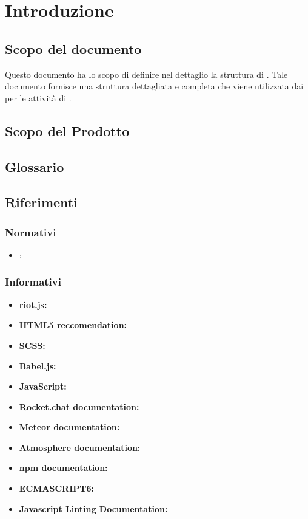 \section{Introduzione}
\subsection{Scopo del documento}
Questo documento ha lo scopo di definire nel dettaglio la struttura di \capitolato. Tale documento fornisce una struttura dettagliata e completa che viene utilizzata dai \ProgrP per le attività di .
\subsection{Scopo del Prodotto}
\scopoProdotto

\subsection{Glossario}
\descrizioneGlossario

\subsection{Riferimenti}
\subsubsection{Normativi}
\riferimentiNormativi
\begin{itemize}
\item \textbf{\AdR}: \analisiDeiRequisiti
\end{itemize}

\subsubsection{Informativi}
\begin{itemize}
\item \textbf{riot.js:} 
\item \textbf{HTML5 reccomendation:} 
\item \textbf{SCSS:} 
\item \textbf{Babel.js:} 
\item \textbf{JavaScript:} 
\item \textbf{Rocket.chat documentation:} 
\item \textbf{Meteor documentation:} 
\item \textbf{Atmosphere documentation:} 
\item \textbf{npm documentation:} 
\item \textbf{ECMASCRIPT6:} 
\item \textbf{Javascript Linting Documentation:} 
\end{itemize}

\newpage

